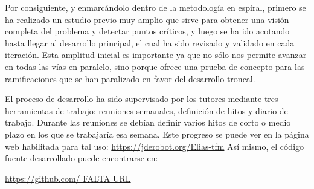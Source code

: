 Por consiguiente, y enmarcándolo dentro de la metodología en espiral, primero se ha realizado un estudio previo muy amplio que sirve para obtener una visión completa del problema y detectar puntos críticos, y luego se ha ido acotando hasta llegar al desarrollo principal, el cual ha sido revisado y validado en cada iteración. Esta amplitud inicial es importante ya que no sólo nos permite avanzar en todas las vías en paralelo, sino porque ofrece una prueba de concepto para las ramificaciones que se han paralizado en favor del desarrollo troncal.

El proceso de desarrollo ha sido supervisado por los tutores mediante tres herramientas de trabajo: reuniones semanales, definición de hitos y diario de trabajo.
Durante las reuniones se debían definir varios hitos de corto o medio plazo en los que se trabajaría esa semana. Este progreso se puede ver en la página web habilitada para tal uso:
\url{https://jderobot.org/Elias-tfm}
Así mismo, el código fuente desarrollado puede encontrarse en:

\url{https://github.com/ FALTA URL}

\clearpage
\newpage
\pagebreak


